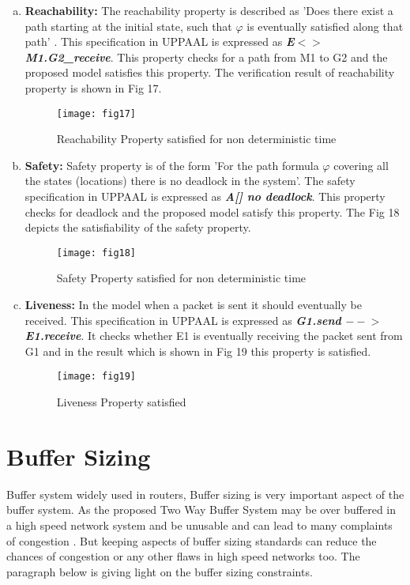 \documentclass[letterpaper]{article}
\begin{document}
	
\begin{enumerate}[(a).]
	\item \textbf{Reachability:} The reachability property is described as 'Does there exist a path starting at the initial state, such that $\varphi$ is eventually satisfied along that path' \cite{BDL06}. This specification in UPPAAL is expressed as \textbf{\textit{E$<>$ M1.G2\_receive}}. This property checks for a path from M1 to G2 and the proposed model satisfies this property. The verification result of reachability property is shown in Fig 17.

\begin{figure}[bpht!]
\centering
	\texttt{[image: fig17]}
	\caption{Reachability Property satisfied for non deterministic time}
	\label{Fig17}
\end{figure}
	
	\item \textbf{Safety:} Safety property is of the form 'For the path formula $\varphi$ covering all the states (locations) there is no deadlock in the system'. The safety specification in UPPAAL is expressed as \textbf{\textit{A[] no deadlock}}. This property checks for deadlock and the proposed model satisfy this property. The Fig 18 depicts the  satisfiability of the safety property. 
  
\begin{figure}[bpht!]
\centering
	\texttt{[image: fig18]}
		\caption{Safety Property satisfied for non deterministic time}
	\label{Fig18}
\end{figure}
	
	\item \textbf{Liveness:} In the model when a packet is sent it should eventually be received. This specification in UPPAAL is expressed as \textbf{\textit{G1.send $--$$>$ E1.receive}}. It checks whether E1 is eventually receiving the packet sent from G1 and in the result which is shown in Fig 19 this property is satisfied. 

\begin{figure}[bpht!]
\centering
	\texttt{[image: fig19]}
		\caption{Liveness Property satisfied}
	\label{Fig19}
\end{figure}
\end{enumerate}





\section{Buffer Sizing}
\label{11}
Buffer system widely used in routers, Buffer sizing is very important aspect of the buffer system. As the proposed Two Way Buffer System may be over buffered in a high speed network system and be unusable and can lead to many complaints of congestion \cite{REF1}. But keeping aspects of buffer sizing standards can reduce the chances of congestion or any other flaws in high speed networks too.  The paragraph below is giving light on the buffer sizing constraints.
\end{document}
